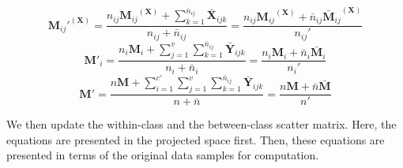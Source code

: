 \begin{equation}
\label{eqn:MijI}
{\textbf{M}_{ij}'}^{(\textbf{X})} = \frac{n_{ij} {\textbf{M}_{ij}}^{(\textbf{X})} + \sum\limits_{k=1}^{\bar{n}_{ij}} \bar{\textbf{X}}_{ijk}}{n_{ij} + \bar{n}_{ij}} = \frac{ n_{ij} {\textbf{M}_{ij}}^{(\textbf{X})} + \bar{n}_{ij} {\bar{\textbf{M}}_{ij}}^{(\textbf{X})}} {n_{ij}'}
\end{equation}
\begin{equation}
\label{eqn:MiI}
\textbf{M}'_{i} = \frac{n_i \textbf{M}_{i} + \sum\limits_{j=1}^{v} \sum\limits_{k=1}^{\bar{n}_{ij}} \bar{\textbf{Y}}_{ijk}}{n_i + \bar{n}_i} = \frac{n_i \textbf{M}_{i} + \bar{n}_i\bar{\textbf{M}}_{i}}{n_i'}
\end{equation}
\begin{equation}
\label{eqn:MI}
\textbf{M}' = \frac{n \textbf{M} + \sum\limits_{i=1}^{c'} \sum\limits_{j=1}^{v} \sum\limits_{k=1}^{\bar{n}_{ij}} \bar{\textbf{Y}}_{ijk}}{n+\bar{n}} = \frac{n \textbf{M} + \bar{n} \bar{\textbf{M}}}{n'}
\end{equation}

We then update the within-class and the between-class scatter matrix. Here, the equations are presented in the projected space first. Then, these equations are presented in terms of the original data samples for computation.




